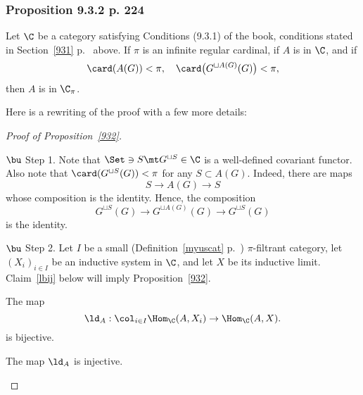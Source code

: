 \documentclass[12pt]{article}
\theoremstyle{remark}
\theoremstyle{definition}
\begin{document}
%

\subsubsection{Proposition 9.3.2 p. 224}

\begin{prop}[Proposition 9.3.2 p.~224] 
Let $\C$ be a category satisfying Conditions (9.3.1) of the book, conditions stated in Section~\ref{931} p.~ above. If $\pi$ is an infinite regular cardinal, if $A$ is in $\C$, and if 
$$
\card(A(G))<\pi,\quad\card\big(G^{\sqcup A(G)}(G)\big)<\pi,
$$ 
then $A$ is in $\C_\pi$.
\end{prop}

Here is a rewriting of the proof with a few more details:

\begin{proof}[Proof of Proposition~\ref{932}]\ 

\nn$\bu$ Step 1. Note that $\Set\ni S\mt G^{\sqcup S}\in\C$ is a well-defined covariant functor. Also note that $\card(G^{\sqcup S}(G))<\pi$ for any $S\subset A(G)$. Indeed, there are maps 
$$
S\to A(G)\to S
$$ 
whose composition is the identity. Hence, the composition 
$$
G^{\sqcup S}(G)\to G^{\sqcup A(G)}(G)\to G^{\sqcup S}(G)
$$ 
is the identity.

\nn$\bu$ Step 2. Let $I$ be a small (Definition~\ref{myuscat} p.~) $\pi$-filtrant category, let $(X_i)_{i\in I}$ be an inductive system in $\C$, and let $X$ be its inductive limit. Claim~\ref{lbij} below will imply Proposition~\ref{932}. 

\begin{claim} 
The map 
$$
\ld_A:\col_{i\in I}\Hom_\C(A,X_i)\to\Hom_\C(A,X).
$$ 
is bijective. 
\end{claim}

\begin{claim} 
The map $\ld_A$ is injective. 
\end{claim} 


\end{proof}
\end{document}
